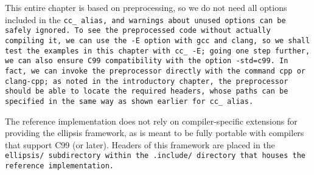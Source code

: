 This entire chapter is based on preprocessing,
so we do not need all options included in the \tt{cc_} alias,
and warnings about unused options can be safely ignored.
To see the preprocessed code without actually compiling it, we can
use the \tt{-E} option with \tt{gcc} and \tt{clang}, so we shall test
the examples in this chapter with \tt{cc_ -E}; going one step further,
we can also ensure C99 compatibility with the option \tt{-std=c99}.
In fact, we can invoke the preprocessor directly with the command
\tt{cpp} or \tt{clang-cpp}; as noted in the introductory chapter,
the preprocessor should be able to locate the required headers, whose paths
can be specified in the same way as shown earlier for \tt{cc_} alias.

\note The reference implementation does not rely on compiler-specific
extensions for providing the ellipsis framework, as is meant to
be fully portable with compilers that support C99 (or later).
Headers of this framework are placed in the \tt{ellipsis/} subdirectory
within the \tt{.include/} directory that houses the reference implementation.













